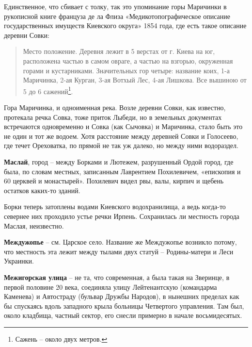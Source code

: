 Единственное, что сбивает с толку, так это упоминание горы Маричинки в рукописной книге француза де ла Флиза «Медикотопографическое описание государственных имуществ Киевского округа» 1854 года, где есть такое описание деревни Совки:

\begin{quotation}
Место положение. Деревня лежит в 5 верстах от г. Киева на юг, расположена частью в самом овраге, а частью на взгорью, окруженная горами и кустарниками. Значительных гор четыре: название коих, 1-а Маричинка, 2-ая Курган, 3-ая Вотхый Лес, 4-ая Лишкова. Все вышиною от 5 до 6 сажений\footnote{Сажень – около двух метров.}.
\end{quotation}

Гора Маричинка, и одноименная река. Возле деревни Совки, как известно, протекала речка Совка, тоже приток Лыбеди, но в земельных документах встречаются одновременно и Совка (как Сычовка) и Маричинка, стало быть это не один и тот же водоем. Хотя расстояние между деревней Совки и Голосеево, где течет Ореховатка, по прямой не так уж далеко, но между ними водораздел.\\ 

\medskip

\textbf{Маслай}, город – между Борками и Лютежем, разрушенный Ордой город, где была, по словам местных, записанным Лаврентием Похилевичем, «епископия и 60 церквей и монастырей». Похилевич видел рвы, валы, кирпич и щебень остатков каких-то зданий.

Борки теперь затоплены водами Киевского водохранилища, а ведь когда-то севернее них проходило устье речки Ирпень. Сохранилась ли местность города Маслая, неизвестно.\\

\medskip

\textbf{Междужопье} – см. Царское село. Название же Междужопье возникло потому, что местность эта лежит между тылами двух статуй – Родины-матери и Леси Украинки.\\

\medskip

\textbf{Межигорская улица} – не та, что современная, а была такая на Зверинце, в первой половине 20 века, соединяла улицу Лейтенантскую (командарма Каменева) и Автостраду (бульвар Дружбы Народов), в нынешних пределах как бы спускаясь вдоль западного крыла больницы Четвертого управления. Там был, около кладбища, частный сектор, его снесли примерно в начале восьмидесятых.\\

\medskip

